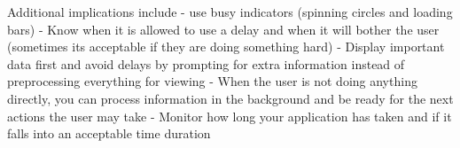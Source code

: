\documentclass[11pt,]{article}
\begin{document}
Additional implications include - use busy indicators (spinning circles
and loading bars) - Know when it is allowed to use a delay and when it
will bother the user (sometimes its acceptable if they are doing
something hard) - Display important data first and avoid delays by
prompting for extra information instead of preprocessing everything for
viewing - When the user is not doing anything directly, you can process
information in the background and be ready for the next actions the user
may take - Monitor how long your application has taken and if it falls
into an acceptable time duration
\end{document}
